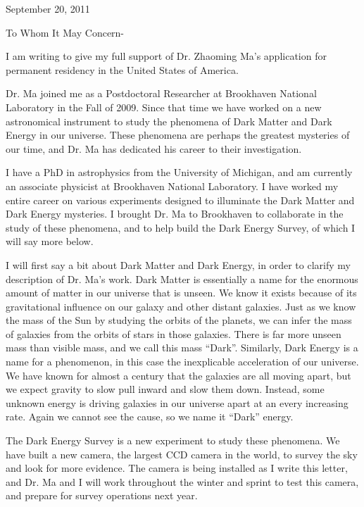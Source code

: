 \documentclass[12pt]{letter}
\begin{document}
\hfill September 20,  2011
\newline

To Whom It May Concern-

I am writing to give my full support of Dr. Zhaoming Ma's application for
permanent residency in the United States of America.

Dr. Ma joined me as a Postdoctoral Researcher at Brookhaven National Laboratory
in the Fall of 2009.  Since that time we have worked on a new astronomical
instrument to study the phenomena of Dark Matter and Dark Energy in our
universe.  These phenomena are perhaps the greatest mysteries of our time, and
Dr. Ma has dedicated his career to their investigation.

I have a PhD in astrophysics from the University of Michigan, and am currently
an associate physicist at Brookhaven National Laboratory.  I have worked my
entire career on various experiments designed to illuminate the Dark Matter and
Dark Energy mysteries.  I brought Dr. Ma to Brookhaven to collaborate in the
study of these phenomena, and to help build the Dark Energy Survey, of which
I will say more below.

I will first say a bit about Dark Matter and Dark Energy, in order to clarify
my description of Dr. Ma's work.  Dark Matter is essentially a name for the
enormous amount of matter in our universe that is unseen.  We know it exists
because of its gravitational influence on our galaxy and other distant
galaxies.  Just as we know the mass of the Sun by studying the orbits of the
planets, we can infer the mass of galaxies from the orbits of stars in those
galaxies.  There is far more unseen mass than visible mass, and we call this
mass ``Dark''.  Similarly, Dark Energy is a name for a phenomenon, in this case
the inexplicable acceleration of our universe. We have known for almost a
century that the galaxies are all moving apart, but we expect gravity to slow
pull inward and slow them down.  Instead, some unknown energy is driving
galaxies in our universe apart at an every increasing rate.  Again we cannot
see the cause, so we name it ``Dark'' energy.

The Dark Energy Survey is a new experiment to study these phenomena.  We have
built a new camera, the largest CCD camera in the world, to survey the sky and
look for more evidence.  The camera is being installed as I write this letter,
and Dr. Ma and I will work throughout the winter and sprint to test this
camera, and prepare for survey operations next year.
\end{document}
